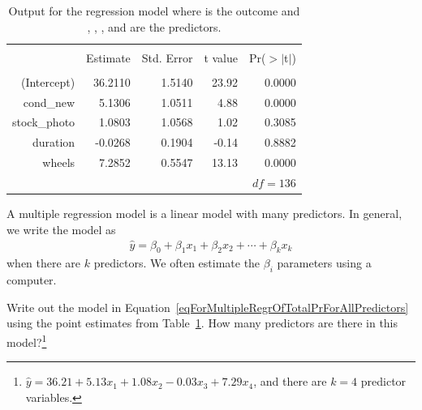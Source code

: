 \begin{table}[ht]
\centering
\begin{tabular}{rrrrr}
  \hline
  \vspace{-3.7mm} & & & & \\
 & Estimate & Std. Error & t value & Pr($>$$|$t$|$) \\ 
  \hline
  \vspace{-3.8mm} & & & & \\
(Intercept) & 36.2110 & 1.5140 & 23.92 & 0.0000 \\ 
  cond\_\hspace{0.3mm}new & 5.1306 & 1.0511 & 4.88 & 0.0000 \\ 
  stock\_\hspace{0.3mm}photo & 1.0803 & 1.0568 & 1.02 & 0.3085 \\ 
  duration & -0.0268 & 0.1904 & -0.14 & 0.8882 \\ 
  wheels & 7.2852 & 0.5547 & 13.13 & 0.0000 \\ 
   \hline
   &&&\multicolumn{2}{r}{$df=136$}
\end{tabular}
\caption{Output for the regression model where  is the outcome and , , , and  are the predictors.}
\label{outputForMultipleRegrOutputForAllPredictors}
\end{table}

\begin{termBox}{
A multiple regression model is a linear model with many predictors. In general, we write the model as
\begin{align*}
\hat{y} = \beta_0 + \beta_1 x_1 + \beta_2 x_2 + \cdots + \beta_k x_k %
\end{align*}
when there are $k$ predictors. We often estimate the $\beta_i$ parameters using a computer.\vspace{1mm}}
\end{termBox}

\textC{\pagebreak}

\begin{exercise} \label{eqForMultipleRegrOfTotalPrForAllPredictorsWithCoefficients}
Write out the model in Equation~\eqref{eqForMultipleRegrOfTotalPrForAllPredictors} using the point estimates from Table~\ref{outputForMultipleRegrOutputForAllPredictors}. How many predictors are there in this model?\footnote{$\hat{y} = 36.21 + 5.13x_1 + 1.08x_2 - 0.03x_3 + 7.29x_4$, and there are $k=4$ predictor variables.}
\end{exercise}

